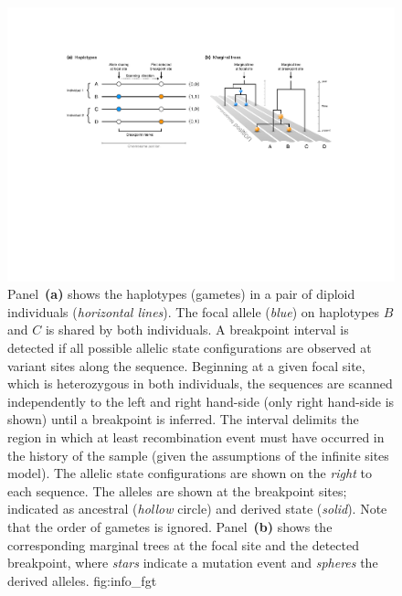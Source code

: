 

\begin{figure}[!htb]
\centering
\includegraphics[width=\textwidth]{./img/ch3/info_fgt_new}
{Panel~\textbf{(a)} shows the  haplotypes (gametes) in a pair of  diploid individuals (\emph{horizontal lines}).
The focal allele (\emph{blue}) on haplotypes $B$ and $C$ is shared by both individuals.
A breakpoint interval is detected if all  possible allelic state configurations are observed at  variant sites along the sequence.
Beginning at a given focal site, which is heterozygous in both individuals, the sequences are scanned independently to the left and right hand-side (only right hand-side is shown) until a breakpoint is inferred.
The interval delimits the region in which at least  recombination event must have occurred in the history of the sample (given the assumptions of the infinite sites model).
The  allelic state configurations are shown on the \emph{right} to each sequence.
The alleles are shown at the  breakpoint sites; indicated as ancestral (\emph{hollow} circle) and derived state (\emph{solid}).
Note that the order of gametes is ignored.
Panel~\textbf{(b)} shows the corresponding marginal trees at the focal site and the detected breakpoint, where \emph{stars} indicate a mutation event and \emph{spheres} the derived alleles.}
{fig:info_fgt}
\end{figure}

